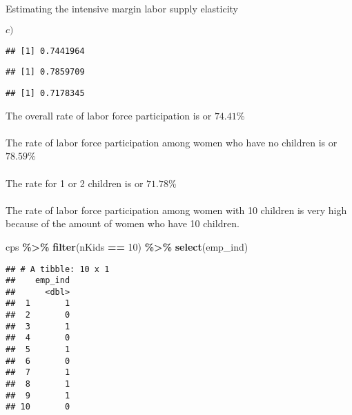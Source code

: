 \documentclass[
  ignorenonframetext,
]{beamer}
\newenvironment{Shaded}{\begin{snugshade}}{\end{snugshade}}
\newcommand{\DecValTok}[1]{\textcolor[rgb]{0.00,0.00,0.81}{#1}}
\newcommand{\KeywordTok}[1]{\textcolor[rgb]{0.13,0.29,0.53}{\textbf{#1}}}
\newcommand{\NormalTok}[1]{#1}
\newcommand{\OperatorTok}[1]{\textcolor[rgb]{0.81,0.36,0.00}{\textbf{#1}}}
\newcommand{\StringTok}[1]{\textcolor[rgb]{0.31,0.60,0.02}{#1}}
\begin{document}
\begin{frame}[fragile]{Estimating the intensive margin labor supply
elasticity}
\begin{block}{\(c)\)}
\begin{verbatim}
## [1] 0.7441964
\end{verbatim}

\begin{Shaded}
\end{Shaded}

\begin{verbatim}
## [1] 0.7859709
\end{verbatim}

\begin{Shaded}
\end{Shaded}

\begin{verbatim}
## [1] 0.7178345
\end{verbatim}

The overall rate of labor force participation is or \(74.41\)\%\\
~\\
The rate of labor force participation among women who have no children
is or \(78.59\)\%\\
~\\
The rate for 1 or 2 children is or \(71.78\)\%\\
~\\
The rate of labor force participation among women with 10 children is
very high because of the amount of women who have 10 children.

\begin{Shaded}
\begin{Highlighting}[]
\NormalTok{cps }\OperatorTok{\%\textgreater{}\%}\StringTok{ }
\StringTok{  }\KeywordTok{filter}\NormalTok{(nKids }\OperatorTok{==}\StringTok{ }\DecValTok{10}\NormalTok{) }\OperatorTok{\%\textgreater{}\%}
\StringTok{  }\KeywordTok{select}\NormalTok{(emp\_ind)}
\end{Highlighting}
\end{Shaded}

\begin{verbatim}
## # A tibble: 10 x 1
##    emp_ind
##      <dbl>
##  1       1
##  2       0
##  3       1
##  4       0
##  5       1
##  6       0
##  7       1
##  8       1
##  9       1
## 10       0
\end{verbatim}


\end{block}
\end{frame}
\end{document}
